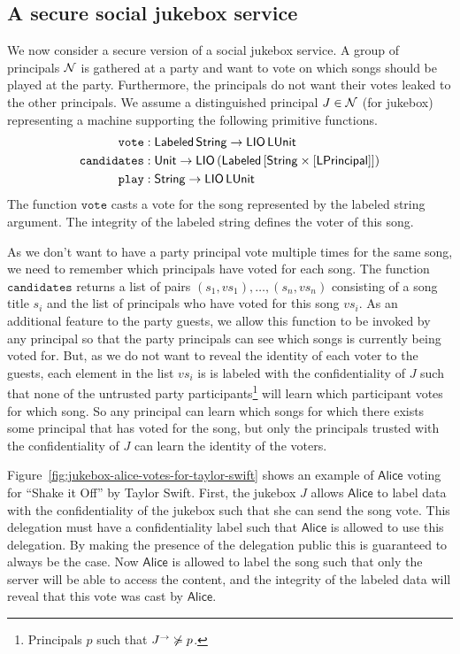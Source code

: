 \subsection{A secure social jukebox service}
We now consider a secure version of a social jukebox service. A group of principals $\mathcal{N}$ is gathered at a party and want to vote on which songs should be played at the party. Furthermore, the principals do not want their votes leaked to the other principals. We assume a distinguished principal $J \in \mathcal{N}$ (for jukebox) representing a machine supporting the following primitive functions.
\begin{align*}
\mathtt{vote}&: \mathsf{Labeled}\,\mathsf{String} \to \mathsf{LIO}\,\mathsf{LUnit}\\
\mathtt{candidates}&: \mathsf{Unit} \to \mathsf{LIO}\,(\mathsf{Labeled}\,\lbrack\mathsf{String} \times \lbrack\mathsf{LPrincipal}\rbrack\rbrack)\\
\mathtt{play}&: \mathsf{String} \to \mathsf{LIO}\,\mathsf{LUnit}
\end{align*}
The function $\mathtt{vote}$ casts a vote for the song represented by the labeled string argument. The integrity of the labeled string defines the voter of this song.

As we don't want to have a party principal vote multiple times for the same song, we need to remember which principals have voted for each song. The function $\mathtt{candidates}$ returns a list of pairs $(s_1, \mathit{vs}_1), \dots, (s_n, {\mathit{vs}}_n)$ consisting of a song title $s_i$ and the list of principals who have voted for this song $\mathit{vs}_i$. As an additional feature to the party guests, we allow this function to be invoked by any principal so that the party principals can see which songs is currently being voted for. But, as we do not want to reveal the identity of each voter to the guests, each element in the list $\mathit{vs}_i$ is is labeled with the confidentiality of $J$ such that none of the untrusted party participants\footnote{Principals $p$ such that $J^{\rightarrow} \not\succcurlyeq p$.} will learn which participant votes for which song. So any principal can learn which songs for which there exists some principal that has voted for the song, but only the principals trusted with the confidentiality of $J$ can learn the identity of the voters.

Figure~\ref{fig:jukebox-alice-votes-for-taylor-swift} shows an example of $\mathsf{Alice}$ voting for ``Shake it Off'' by Taylor Swift. First, the jukebox $J$ allows $\mathsf{Alice}$ to label data with the confidentiality of the jukebox such that she can send the song vote. This delegation must have a confidentiality label such that $\mathsf{Alice}$ is allowed to use this delegation. By making the presence of the delegation public this is guaranteed to always be the case. Now $\mathsf{Alice}$ is allowed to label the song such that only the server will be able to access the content, and the integrity of the labeled data will reveal that this vote was cast by $\mathsf{Alice}$.

